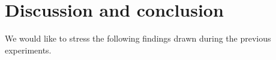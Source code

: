 \section{Discussion and conclusion}\label{sec:chp6:discussion}

We would like to stress the following findings drawn during the previous experiments.



